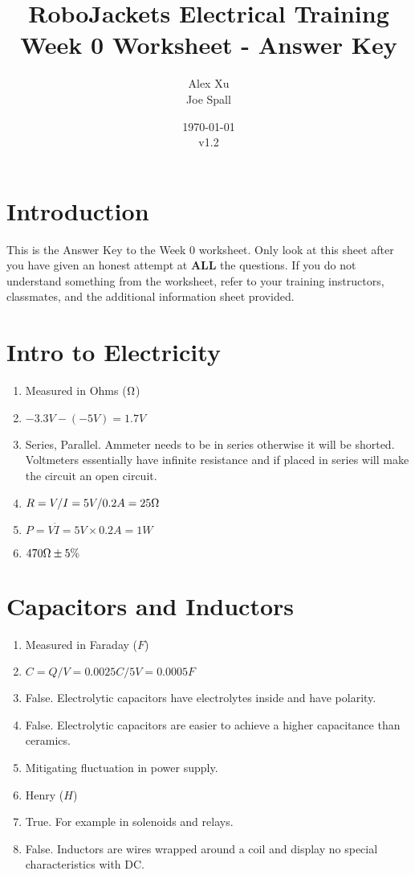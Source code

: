 \documentclass{article}
\title{RoboJackets Electrical Training Week 0 Worksheet - Answer Key}
\author{Alex Xu \\ Joe Spall}
\date{\today\\v1.2}
\begin{document}
\maketitle{}
\setcounter{tocdepth}{2}
\tableofcontents


\pagebreak

\section{Introduction}
This is the Answer Key to the Week 0 worksheet. Only look at this sheet after you have given an honest attempt at \textbf{ALL} the questions. If you do not understand something from the worksheet, refer to your training instructors, classmates, and the additional information sheet provided.

\section{Intro to Electricity}
\begin{enumerate}
	\item Measured in Ohms ($\ohm$)
	\item $-3.3V-(-5V)=1.7V$
	\item Series, Parallel. Ammeter needs to be in series otherwise it will be shorted. Voltmeters essentially have infinite resistance and if placed in series will make the circuit an open circuit.
	\item $R=V/I=5V/0.2A=25\ohm$
	\item $P=V\dot I = 5V \times 0.2 A = 1W$
	\item $470\ohm \pm 5\%$
\end{enumerate}

\section{Capacitors and Inductors}
\begin{enumerate}
	\item Measured in Faraday ($F$)
	\item $C=Q/V=0.0025C/5V=0.0005F$
	\item False. Electrolytic capacitors have electrolytes inside and have polarity.
	\item False. Electrolytic capacitors are easier to achieve a higher capacitance than ceramics.
	\item Mitigating fluctuation in power supply.
	\item Henry ($H$)
	\item True. For example in solenoids and relays.
	\item False. Inductors are wires wrapped around a coil and display no special characteristics with DC.
\end{enumerate}
\end{document}
